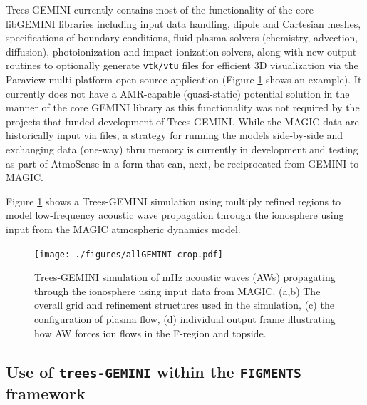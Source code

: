 \documentclass[11pt,letterpaper]{article}
\begin{document}
Trees-GEMINI currently contains most of the functionality of the core libGEMINI libraries including input data handling, dipole and Cartesian meshes, specifications of boundary conditions, fluid plasma solvers (chemistry, advection, diffusion), photoionization and impact ionization solvers, along with new output routines to optionally generate \texttt{vtk/vtu} files for efficient 3D visualization via the Paraview multi-platform open source application (Figure \ref{fig:Trees-GEMINI} shows an example).  It currently does not have a AMR-capable (quasi-static) potential solution in the manner of the core GEMINI library as this functionality was not required by the projects that funded development of Trees-GEMINI.  While the MAGIC data are historically input via files, a strategy for running the models side-by-side and exchanging data (one-way) thru memory is currently in development and testing as part of AtmoSense in a form that can, next, be reciprocated from GEMINI to MAGIC.  %

Figure \ref{fig:Trees-GEMINI} shows a Trees-GEMINI simulation using multiply refined regions to model low-frequency acoustic wave propagation through the ionosphere using input from the MAGIC atmospheric dynamics model.  
\begin{figure}
  \texttt{[image: ./figures/allGEMINI-crop.pdf]}
  \caption{Trees-GEMINI simulation of mHz acoustic waves (AWs) propagating through the ionosphere using input data from MAGIC.  (a,b) The overall grid and refinement structures used in the simulation, (c) the configuration of plasma flow, (d) individual output frame illustrating how AW forces ion flows in the F-region and topside.}
  \label{fig:Trees-GEMINI}
\end{figure}


\subsection{Use of \texttt{trees-GEMINI} within the \texttt{FIGMENTS} framework}
\end{document}
